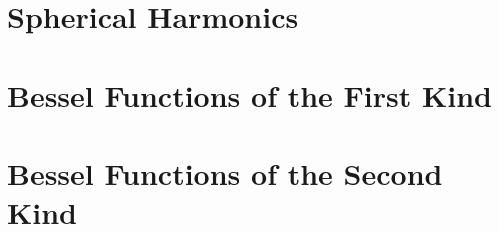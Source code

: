 \documentclass[oneside]{book}
\numberwithin{figure}{section}
\numberwithin{equation}{section}
\theoremstyle{definition}
\begin{document}
	\section{Spherical Harmonics}
	\section{Bessel Functions of the First Kind}
	\section{Bessel Functions of the Second Kind}
	
\end{document}
